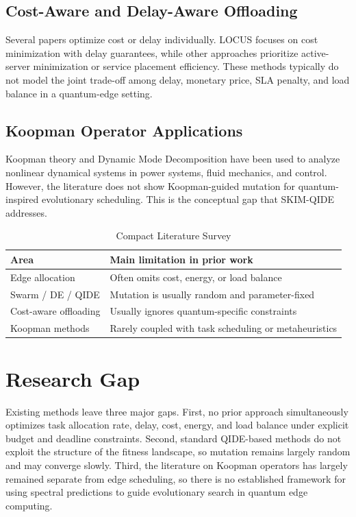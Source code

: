 \documentclass[12pt,a4paper]{article}
\begin{document}
\subsection{Cost-Aware and Delay-Aware Offloading}
Several papers optimize cost or delay individually. LOCUS focuses on cost minimization with delay guarantees, while other approaches prioritize active-server minimization or service placement efficiency. These methods typically do not model the joint trade-off among delay, monetary price, SLA penalty, and load balance in a quantum-edge setting.

\subsection{Koopman Operator Applications}
Koopman theory and Dynamic Mode Decomposition have been used to analyze nonlinear dynamical systems in power systems, fluid mechanics, and control. However, the literature does not show Koopman-guided mutation for quantum-inspired evolutionary scheduling. This is the conceptual gap that SKIM-QIDE addresses.

\begin{table}[t]
\centering\caption{Compact Literature Survey}\label{tab:lit}
\small\renewcommand{\arraystretch}{1.15}
\begin{tabular}{|p{2.1cm}|p{5.7cm}|}
\hline
Area & Main limitation in prior work \\\hline
Edge allocation & Often omits cost, energy, or load balance \\\hline
Swarm / DE / QIDE & Mutation is usually random and parameter-fixed \\\hline
Cost-aware offloading & Usually ignores quantum-specific constraints \\\hline
Koopman methods & Rarely coupled with task scheduling or metaheuristics \\\hline
\end{tabular}
\end{table}

\section{Research Gap}

Existing methods leave three major gaps. First, no prior approach simultaneously optimizes task allocation rate, delay, cost, energy, and load balance under explicit budget and deadline constraints. Second, standard QIDE-based methods do not exploit the structure of the fitness landscape, so mutation remains largely random and may converge slowly. Third, the literature on Koopman operators has largely remained separate from edge scheduling, so there is no established framework for using spectral predictions to guide evolutionary search in quantum edge computing.
\end{document}
